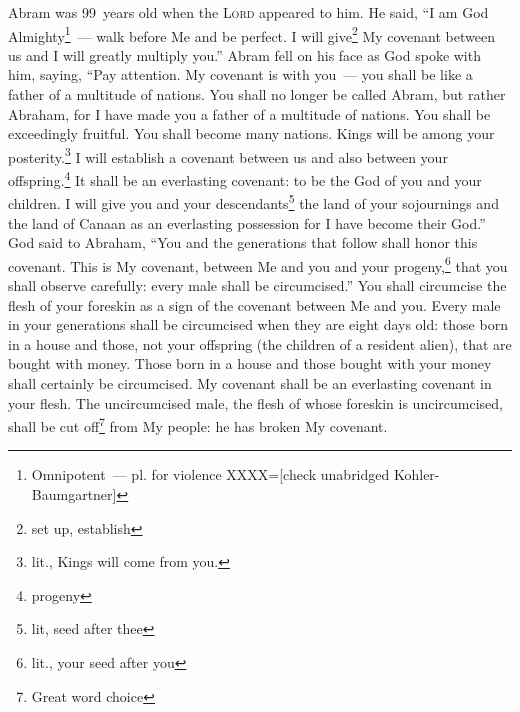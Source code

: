 
\begin{inparaenum}
     Abram was 99~years old when the \textsc{Lord} appeared to him. He said, ``I am God Almighty\footnote{Omnipotent~--- pl. for violence XXXX=[check unabridged Kohler-Baumgartner]}~--- walk before Me and be perfect.%
     I will give\footnote{set up, establish} My covenant between us and I will greatly multiply you.''%
     Abram fell on his face as God spoke with him, saying,%
     ``Pay attention. My covenant is with you~--- you shall be like a father of a multitude of nations.%
     You shall no longer be called Abram, but rather Abraham, for I have made you a father of a multitude of nations.%
     You shall be exceedingly fruitful. You shall become many nations. Kings will be among your posterity.\footnote{lit., Kings will come from you.}%
     I will establish a covenant between us and also between your offspring.\footnote{progeny} It shall be an everlasting covenant: to be the God of you and your children.%
     I will give you and your descendants\footnote{lit, seed after thee} the land of your sojournings and the land of Canaan as an everlasting possession for I have become their God.''%
     God said to Abraham, ``You and the generations that follow shall honor this covenant.%
     This is My covenant, between Me and you and your progeny,\footnote{lit., your seed after you} that you shall observe carefully: every male shall be circumcised.''%
     You shall circumcise the flesh of your foreskin as a sign of the covenant between Me and you.%
     Every male in your generations shall be circumcised when they are eight days old: those born in a house and those, not your offspring (the children of a resident alien), that are bought with money.%
     Those born in a house and those bought with your money shall certainly be circumcised. My covenant shall be an everlasting covenant in your flesh.%
     The uncircumcised male, the flesh of whose foreskin is uncircumcised, shall be cut off\footnote{Great word choice} from My people: he has broken My covenant.%
    

\end{inparaenum}
